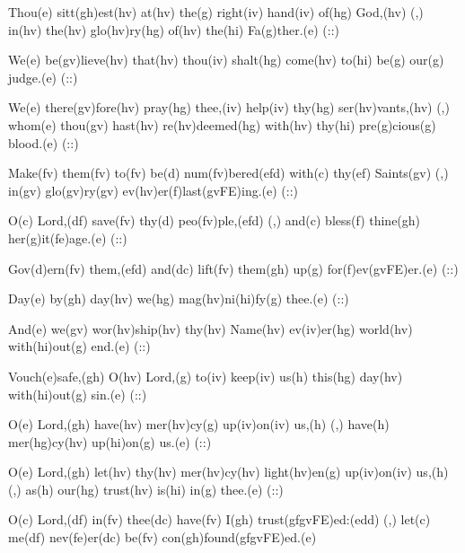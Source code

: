 Thou(e) sitt(gh)est(hv) at(hv) the(g) right(iv) hand(iv) of(hg) God,(hv) (,) in(hv) the(hv) glo(hv)ry(hg) of(hv) the(hi) Fa(g)ther.(e) (::) 

We(e) be(gv)lieve(hv) that(hv) thou(iv) shalt(hg) come(hv) to(hi) be(g) our(g) judge.(e) (::)

We(e) there(gv)fore(hv) pray(hg) thee,(iv) help(iv) thy(hg) ser(hv)vants,(hv) (,) whom(e) thou(gv) hast(hv) re(hv)deemed(hg) with(hv) thy(hi) pre(g)cious(g) blood.(e) (::)

Make(fv) them(fv) to(fv) be(d) num(fv)bered(efd) with(c) thy(ef) Saints(gv) (,) in(gv) glo(gv)ry(gv) ev(hv)er(f)last(gvFE)ing.(e) (::)

O(c) Lord,(df) save(fv) thy(d) peo(fv)ple,(efd) (,) and(c) bless(f) thine(gh) her(g)it(fe)age.(e) (::)

Gov(d)ern(fv) them,(efd) and(dc) lift(fv) them(gh) up(g) for(f)ev(gvFE)er.(e) (::)

Day(e) by(gh) day(hv) we(hg) mag(hv)ni(hi)fy(g) thee.(e) (::)

And(e) we(gv) wor(hv)ship(hv) thy(hv) Name(hv) ev(iv)er(hg) world(hv) with(hi)out(g) end.(e) (::)

Vouch(e)safe,(gh) O(hv) Lord,(g) to(iv) keep(iv) us(h) this(hg) day(hv) with(hi)out(g) sin.(e) (::)

O(e) Lord,(gh) have(hv) mer(hv)cy(g) up(iv)on(iv) us,(h) (,) have(h) mer(hg)cy(hv) up(hi)on(g) us.(e) (::)

O(e) Lord,(gh) let(hv) thy(hv) mer(hv)cy(hv) light(hv)en(g) up(iv)on(iv) us,(h) (,) as(h) our(hg) trust(hv) is(hi) in(g) thee.(e) (::)

O(c) Lord,(df) in(fv) thee(dc) have(fv) I(gh) trust(gfgvFE)ed:(edd) (,) let(c) me(df) nev(fe)er(dc) be(fv) con(gh)found(gfgvFE)ed.(e)
